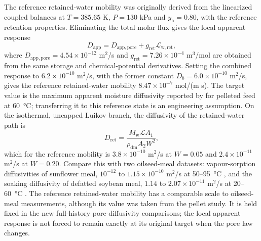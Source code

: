 The reference retained-water mobility was originally derived
from the linearized coupled balances at $T=385.65$ K, $P=130$ kPa and
$y_{\mathrm h}=0.80$, with the reference retention properties.
Eliminating the total molar flux gives the local apparent response
\[
D_{\mathrm{app}}=D_{\mathrm{app,pore}}+g_{\mathrm{ret}}\mathcal L_{\mathrm{w,ret}},
\]
where $D_{\mathrm{app,pore}}=4.54\times10^{-12}$ m$^2$/s and
$g_{\mathrm{ret}}=7.26\times10^{-4}$ m$^3$/mol are obtained from the
same storage and chemical-potential derivatives. Setting the combined
response to $6.2\times10^{-10}$ m$^2$/s, with the former constant
$D_b=6.0\times10^{-10}$ m$^2$/s, gives the reference retained-water
mobility $8.47\times10^{-7}$ mol/(m s). The target value is the maximum apparent
moisture diffusivity reported by \citet{touffet2026moisture} for
pelleted feed at \SI{60}{\celsius}; transferring it to this reference
state is an engineering assumption. On the isothermal, uncapped Luikov
branch, the diffusivity of the retained-water path is
\[
D_{\mathrm{ret}}=
\frac{M_{\mathrm w}\mathcal L A_1}{\rho_{\mathrm{dm}}A_2W^2},
\]
which for the reference mobility is $3.8\times10^{-10}$ m$^2$/s at
$W=0.05$ and $2.4\times10^{-11}$ m$^2$/s at $W=0.20$. Compare this with
two oilseed-meal datasets: vapour-sorption diffusivities of
sunflower meal, $10^{-12}$ to $1.15\times10^{-10}$ m$^2$/s at
50--\SI{95}{\celsius} \citep{cardarelli1998thesis}, and the soaking
diffusivity of defatted soybean meal, $1.14$ to $2.07\times10^{-11}$
m$^2$/s at 20--\SI{60}{\celsius} \citep{mukherjee2019soaking}. The
reference retained-water mobility has a comparable scale to oilseed-meal
measurements, although its value was taken from the pellet study. It is
held fixed in the new full-history pore-diffusivity comparisons; the local
apparent response is not forced to remain exactly at its original target
when the pore law changes.

